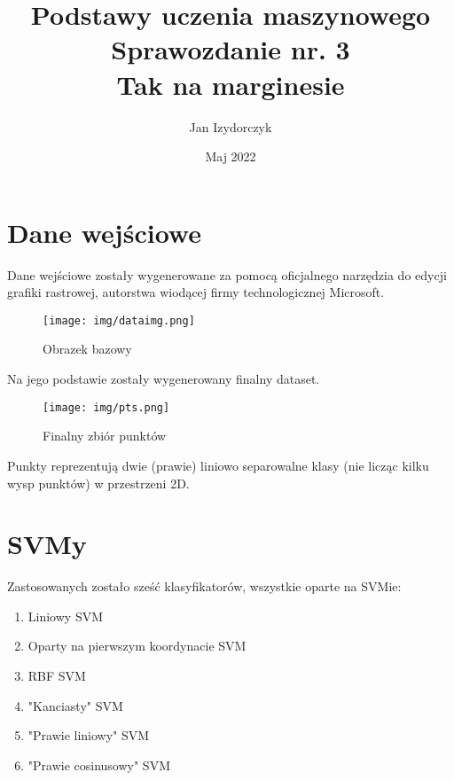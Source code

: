 

\title{Podstawy uczenia maszynowego \\ Sprawozdanie nr. 3 \\ Tak na marginesie}
\author{Jan Izydorczyk}
\date{Maj 2022}




\maketitle

\section{Dane wejściowe}

Dane wejściowe zostały wygenerowane za pomocą oficjalnego narzędzia do edycji grafiki rastrowej, autorstwa wiodącej firmy technologicznej Microsoft\cite{paint}. 


\begin{figure}[H]
        \centering
        \texttt{[image: img/dataimg.png]}
        \caption{Obrazek bazowy}
\end{figure}

Na jego podstawie zostały wygenerowany finalny dataset.

\begin{figure}[H]
        \centering
        \texttt{[image: img/pts.png]}
        \caption{Finalny zbiór punktów}
\end{figure}

Punkty reprezentują dwie (prawie) liniowo separowalne klasy (nie licząc kilku wysp punktów) w przestrzeni 2D. 

\section{SVMy}

Zastosowanych zostało sześć klasyfikatorów, wszystkie oparte na SVMie:

\begin{enumerate}
    \item Liniowy SVM
    \item Oparty na pierwszym koordynacie SVM
    \item RBF SVM
    \item "Kanciasty" SVM
    \item "Prawie liniowy" SVM
    \item "Prawie cosinusowy" SVM
\end{enumerate}

